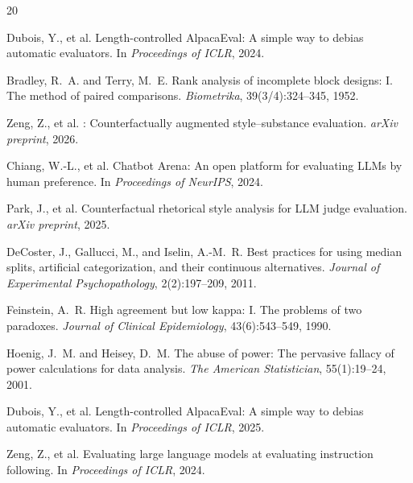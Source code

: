 \documentclass[11pt,a4paper]{article}
\begin{document}
\begin{thebibliography}{20}

Dubois, Y., et al.
\newblock Length-controlled {A}lpaca{E}val: A simple way to debias automatic evaluators.
\newblock In \emph{Proceedings of ICLR}, 2024.

Bradley, R.~A. and Terry, M.~E.
\newblock Rank analysis of incomplete block designs: {I}. {T}he method of paired comparisons.
\newblock \emph{Biometrika}, 39(3/4):324--345, 1952.

Zeng, Z., et al.
: Counterfactually augmented style--substance evaluation.
\newblock \emph{arXiv preprint}, 2026.

Chiang, W.-L., et al.
\newblock Chatbot {A}rena: An open platform for evaluating {LLM}s by human preference.
\newblock In \emph{Proceedings of NeurIPS}, 2024.

Park, J., et al.
\newblock Counterfactual rhetorical style analysis for {LLM} judge evaluation.
\newblock \emph{arXiv preprint}, 2025.

DeCoster, J., Gallucci, M., and Iselin, A.-M.~R.
\newblock Best practices for using median splits, artificial categorization, and their continuous alternatives.
\newblock \emph{Journal of Experimental Psychopathology}, 2(2):197--209, 2011.

Feinstein, A.~R.
\newblock High agreement but low kappa: {I}. {T}he problems of two paradoxes.
\newblock \emph{Journal of Clinical Epidemiology}, 43(6):543--549, 1990.

Hoenig, J.~M. and Heisey, D.~M.
\newblock The abuse of power: The pervasive fallacy of power calculations for data analysis.
\newblock \emph{The American Statistician}, 55(1):19--24, 2001.

Dubois, Y., et al.
\newblock Length-controlled {A}lpaca{E}val: A simple way to debias automatic evaluators.
\newblock In \emph{Proceedings of ICLR}, 2025.

Zeng, Z., et al.
\newblock Evaluating large language models at evaluating instruction following.
\newblock In \emph{Proceedings of ICLR}, 2024.


\end{thebibliography}
\end{document}
